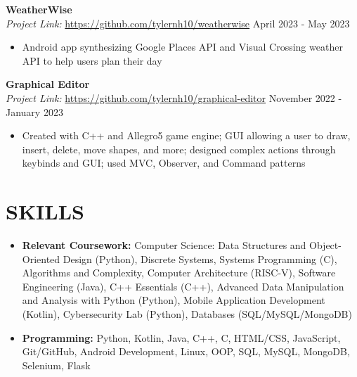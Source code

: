 \documentclass[a4paper,10pt]{extarticle}
\begin{document}
\noindent
\textbf{WeatherWise}\\ %
\textit{Project Link:} \url{https://github.com/tylernh10/weatherwise} \hfill April 2023 - May 2023 %
\begin{itemize}[topsep=3pt]
    \item Android app synthesizing Google Places API and Visual Crossing weather API to help users plan their day %
\end{itemize}

\noindent
\textbf{Graphical Editor}\\ %
\textit{Project Link:} \url{https://github.com/tylernh10/graphical-editor} \hfill November 2022 - January 2023 %
\begin{itemize}[topsep=3pt]
    \item Created with C++ and Allegro5 game engine; GUI allowing a user to draw, insert, delete, move shapes, and more; designed complex actions through keybinds and  GUI; used MVC, Observer, and Command patterns %
\end{itemize}

\section*{SKILLS}
\begin{itemize}
    \item \textbf{Relevant Coursework:} Computer Science: Data Structures and Object-Oriented Design (Python), Discrete Systems, Systems Programming (C), Algorithms and Complexity, Computer Architecture (RISC-V), Software Engineering (Java), C++ Essentials (C++), Advanced Data Manipulation and Analysis with Python (Python), Mobile Application Development (Kotlin), Cybersecurity Lab (Python), Databases (SQL/MySQL/MongoDB) %
    \item \textbf{Programming:} Python, Kotlin, Java, C++, C, HTML/CSS, JavaScript, Git/GitHub, Android Development, Linux, OOP, SQL, MySQL, MongoDB, Selenium, Flask %
\end{itemize}

\end{document}
